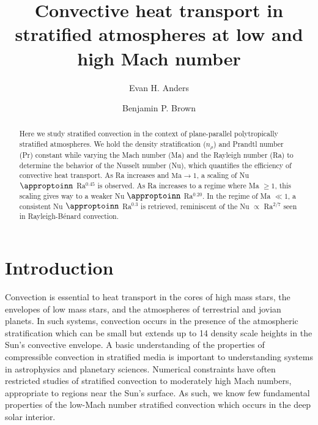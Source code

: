 \documentclass[aps, prl, twocolumn, nofootinbib, groupedaddress, amsfonts, amssymb, amsmath]{revtex4-1}
\newcommand{\RB}{Rayleigh-B\'{e}nard }
\newcommand{\nrho}{\ensuremath{n_{\rho}}}
\newcommand{\approptoinn}[2]{\mathrel{\vcenter{
	\offinterlineskip\halign{\hfil$##$\cr
	#1\propto\cr\noalign{\kern2pt}#1\sim\cr\noalign{\kern-2pt}}}}}
\newcommand{\appropto}{\mathpalette\approptoinn\relax}
\begin{document}
\author{Evan H. Anders}
\author{Benjamin P. Brown}
\title{Convective heat transport in stratified atmospheres at low and high Mach number}

\begin{abstract}
Here we study stratified convection in the context of 
plane-parallel polytropically stratified atmospheres. 
We hold the density stratification (\nrho) and Prandtl number (Pr) constant while varying the
Mach number (Ma) and the Rayleigh number (Ra) to determine the behavior of the Nusselt number (Nu), 
which quantifies the efficiency of convective heat transport.
As Ra increases and $\text{Ma} \rightarrow 1$, a scaling of Nu $\appropto$ Ra$^{0.45}$ is observed.  
As Ra increases to a regime where Ma $\geq 1$,
this scaling gives way to a weaker Nu $\appropto$ Ra$^{0.20}$.  In the regime of Ma $\ll 1$, a consistent
Nu $\appropto$ Ra$^{0.3}$ is retrieved,  reminiscent of the Nu $\propto$ Ra$^{2/7}$ seen in \RB convection.
\end{abstract}
\maketitle


\section{Introduction}
\label{sec:intro}
Convection is essential to heat transport in the cores of high mass stars, the
envelopes of low mass stars, and the atmospheres of terrestrial and jovian planets. In such systems, convection
occurs in the presence of the atmospheric stratification which can be small but extends up to 
14 density scale heights in the Sun's convective envelope.
A basic understanding of the
properties of compressible convection in stratified media is important to understanding systems in astrophysics
and planetary sciences.  Numerical constraints have often restricted studies of stratified convection to
moderately high Mach numbers, appropriate to regions near the Sun's surface.  As such, we know few
fundamental properties of the low-Mach number stratified convection which occurs in the deep solar interior.
\end{document}
